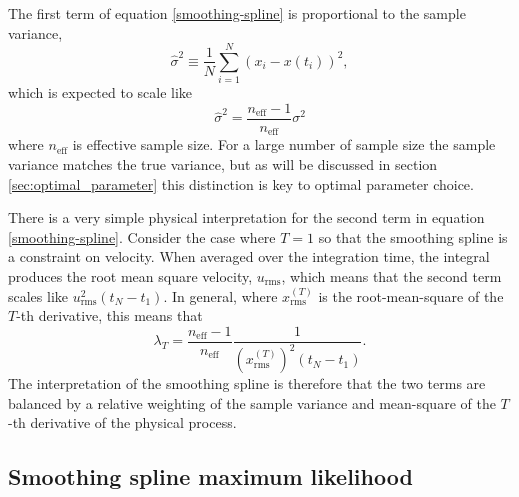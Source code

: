 \documentclass[10pt,journal]{IEEEtran}
\begin{document}
The first term of equation \ref{smoothing-spline} is proportional to the sample variance,
\begin{equation}
\label{sample_variance}
\hat{\sigma}^2  \equiv \frac{1}{N} \sum_{i=1}^{N} \left( x_i - x(t_i) \right) ^2,
\end{equation}
which is expected to scale like
\begin{equation}
\label{sample_variance_variance}
\hat{\sigma}^2 = \frac{n_{\textrm{eff}}-1}{n_{\textrm{eff}}} \sigma^2
\end{equation}
where $n_{\textrm{eff}}$ is effective sample size. For a large number of sample size the sample variance matches the true variance, but as will be discussed in section \ref{sec:optimal_parameter} this distinction is key to optimal parameter choice.

There is a very simple physical interpretation for the second term in equation \ref{smoothing-spline}. Consider the case where $T=1$ so that the smoothing spline is a constraint on velocity. When averaged over the integration time, the integral produces the root mean square velocity, $u_{\textrm{rms}}$, which means that the second term scales like $u_{\textrm{rms}}^2 (t_N-t_1)$. In general, where $x^{(T)}_{\textrm{rms}}$ is the root-mean-square of the $T$-th derivative, this means that
\begin{equation}
\label{lambda}
\lambda_T = \frac{n_{\textrm{eff}}-1}{n_{\textrm{eff}}} \frac{1}{ \left(x^{(T)}_{\textrm{rms}}\right)^2 (t_N-t_1)}.
\end{equation}
The interpretation of the smoothing spline is therefore that the two terms are balanced by a relative weighting of the sample variance and mean-square of the $T$-th derivative of the physical process.

\subsection{Smoothing spline maximum likelihood}
\label{sec:maximum_lielihood}
\end{document}
